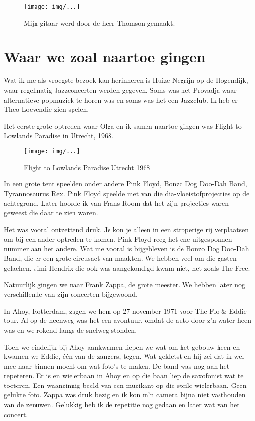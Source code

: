 \documentclass[10pt,twoside,openright]{memoir}
\begin{document}
\begin{figure}[t]
\texttt{[image: img/...]}
\caption{Mijn gitaar werd door de heer Thomson gemaakt.}
\end{figure} 

\chapter{Waar we zoal naartoe gingen} %
\label{cha:naartoegaan}

Wat ik me als vroegste bezoek kan herinneren is Huize Negrijn op de Hogendijk, waar regelmatig Jazzconcerten werden gegeven. Soms was het Provadja waar alternatieve popmuziek te horen was en soms was het een Jazzclub. Ik heb er Theo Loevendie zien spelen.

Het eerste grote optreden waar Olga en ik samen naartoe gingen was Flight to Lowlands Paradise in Utrecht, 1968.

\begin{figure}[t]
\texttt{[image: img/...]}
\caption{Flight to Lowlands Paradise Utrecht 1968}
\end{figure}

In een grote tent speelden onder andere Pink Floyd, Bonzo Dog Doo-Dah Band, Tyrannosaurus Rex. Pink Floyd speelde met van die dia-vloeistofprojecties op de achtegrond. Later hoorde ik van Frans Room dat het zijn projecties waren geweest die daar te zien waren.

Het was vooral ontzettend druk. Je kon je alleen in een stroperige rij verplaatsen om bij een ander optreden te komen. 
Pink Floyd reeg het ene uitgesponnen nummer aan het andere. Wat me vooral is bijgebleven is de Bonzo Dog Doo-Dah Band, die er een grote circusact van maakten. We hebben veel om die gasten gelachen. Jimi Hendrix die ook was aangekondigd kwam niet, net zoals The Free.

Natuurlijk gingen we naar Frank Zappa, de grote meester. We hebben later nog verschillende van zijn concerten bijgewoond.

In Ahoy, Rotterdam, zagen we hem op 27 november 1971 voor The Flo & Eddie tour. Al op de heenweg was het een avontuur, omdat de auto door z’n water heen was en we rokend langs de snelweg stonden. 

Toen we eindelijk bij Ahoy aankwamen liepen we wat om het gebouw heen en kwamen we Eddie, één van de zangers, tegen. Wat gekletst en hij zei dat ik wel mee naar binnen mocht om wat foto's te maken. De band was nog aan het repeteren. Er is en wielerbaan in Ahoy en op die baan liep de saxofonist wat te toeteren. Een waanzinnig beeld van een muzikant op die steile wielerbaan. Geen gelukte foto. Zappa was druk bezig en ik kon m’n camera bijna niet vasthouden van de zenuwen. Gelukkig heb ik de repetitie nog gedaan en later wat van het concert. 
\end{document}
